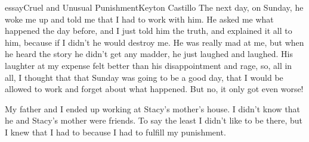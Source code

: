\begin{prose}{essay}{Cruel and Unusual Punishment}{Keyton Castillo}
The next day, on Sunday, he woke me up and told me that I had to work with him. He asked me what happened the day before, and I just told him the truth, and explained it all to him, because if I didn't he would destroy me. He was really mad at me, but when he heard the story he didn't get any madder, he just laughed and laughed. His laughter at my expense felt better than his disappointment and rage, so, all in all, I thought that that Sunday was going to be a good day, that I would be allowed to work and forget about what happened. But no, it only got even worse!\par
My father and I ended up working at Stacy's mother's house. I didn't know that he and Stacy's mother were friends. To say the least I didn't like to be there, but I knew that I had to because I had to fulfill my punishment.
\end{prose}

% 



